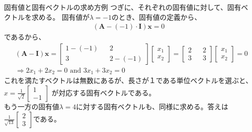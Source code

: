 \documentclass[dvipdfmx,autodetect-engine, unicode, 10pt, aspectratio=169]{beamer}
\begin{document}
\begin{frame}{固有値と固有ベクトルの求め方例}
    つぎに、それぞれの固有値に対して、固有ベクトルを求める。
    固有値が$\lambda = -1$のとき、固有値の定義から、
    \begin{align*}
        (\bm{A} - (-1)\cdot \bm{I} )\bm{x} = 0
    \end{align*}
    であるから、
    \begin{align*}
        &(\bm{A} - \bm{I})\bm{x} = 
            \begin{bmatrix}
                1-(-1) && 2 \\
                3 && 2 - (-1)
            \end{bmatrix}
            \begin{bmatrix}
                x_1 \\ x_2
            \end{bmatrix} = 
            \begin{bmatrix}
                2 && 2 \\
                3 && 3
            \end{bmatrix}
            \begin{bmatrix}
                x_1 \\ x_2
            \end{bmatrix} = 0 \\
            &\Rightarrow 2x_1 + 2x_2 = 0 \text{ and } 3x_1 + 3x_2 = 0
    \end{align*}
    これを満たすベクトルは無数にあるが、長さが１である単位ベクトルを選ぶと、\\
    $x = \frac{1}{\sqrt{2}}\begin{bmatrix}
        1 \\ -1
    \end{bmatrix}$
    が対応する固有ベクトルである。\\もう一方の固有値$\lambda =4$に対する固有ベクトルも、同様に求める。答えは
    $\frac{1}{\sqrt{13}}\begin{bmatrix}
        2 \\ 3
    \end{bmatrix}$である。
    
\end{frame}
\end{document}
